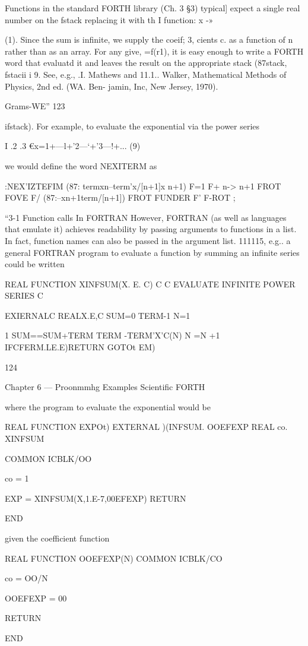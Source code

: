 Functions in the standard FORTH library (Ch. 3 §3) typical]
expect a single real number on the fstack replacing it with th I
function: x -» {(1). Since the sum is inﬁnite, we supply the coeif; 3,
cients c. as a function of n rather than as an array. For any give,
=f(r1), it is easy enough to write a FORTH word that evaluatd
it and leaves the result on the appropriate stack (87stack, fstacii
i
9. See, e.g., .I. Mathews and 11.1.. Walker, Mathematical Methods of Physics, 2nd ed. (WA. Ben-
jamin, Inc, New Jersey, 1970).

Grams-WE” 123

ifstack). For example, to evaluate the exponential via the power
series

I .2 .3
€x=1+—l+'2—‘+'3—!+... (9)

we would deﬁne the word NEXITERM as

:NEX'IZTEFIM (87: termxn--term'x/[n+1]x n+1)
F=1 F+ n-> n+1
FROT FOVE F/ (87:--xn+1term/[n+1])
FROT FUNDER F' F-ROT ;

“3-1 Function calls In FORTRAN
However, FORTRAN (as well as languages that emulate it)
achieves readability by passing arguments to functions in a list. In
fact, function names can also be passed in the argument list. 111115,
e.g.. a general FORTRAN program to evaluate a function by
summing an inﬁnite series could be written

REAL FUNCTION XINFSUM(X. E. C)
C
C EVALUATE INFINITE POWER SERIES
C

EXIERNALC
REALX.E,C
SUM=0
TERM-1
N=1

1 SUM==SUM+TERM
TERM -TERM'X'C(N)
N =N +1
IFCFERM.LE.E)RETURN
GOTOt
EM)

124

Chapter 6 — Proonmmhg Examples Scientiﬁc FORTH

where the program to evaluate the exponential would be

REAL FUNCTION EXPOt)
EXTERNAL )(INFSUM. OOEFEXP
REAL co. XINFSUM

COMMON ICBLK/OO

co = 1

EXP = XINFSUM(X,1.E-7,00EFEXP)
RETURN

END

given the coefficient function

REAL FUNCTION OOEFEXP(N)
COMMON ICBLK/CO

co = OO/N

OOEFEXP = 00

RETURN

END

}
